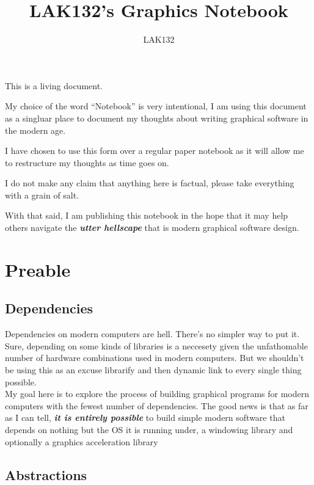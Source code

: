 \documentclass{article}
\title{LAK132's Graphics Notebook}
\author{LAK132}
\newcommand{\textem}[1]{\textit{\textbf{#1}}}
\begin{document}
\maketitle

This is a living document.

My choice of the word ``Notebook'' is very intentional,
I am using this document as a singluar place to document my thoughts about
writing graphical software in the modern age.

I have chosen to use this form over a regular paper notebook as it will allow
me to restructure my thoughts as time goes on.

I do not make any claim that anything here is factual,
please take everything with a grain of salt.

With that said, I am publishing this notebook in the hope that it may help
others navigate the \textem{utter hellscape} that is modern graphical
software design.

\pagebreak
\tableofcontents


\pagebreak
\section{Preable}
\label{sec:preamble}

\subsection{Dependencies}
\label{subsect:dependencies}

Dependencies on modern computers are hell.
There's no simpler way to put it.
Sure, depending on some kinds of libraries is a neccesety given the
unfathomable number of hardware combinations used in modern computers.
But we shouldn't be using this as an excuse librarify and then dynamic link to
every single thing possible.
\\
My goal here is to explore the process of building graphical programs for
modern computers with the fewest number of dependencies.
The good news is that as far as I can tell,
\textem{it is entirely possible} to build simple modern software that
depends on nothing but the OS it is running under, a windowing library and
optionally a graphics acceleration library

\subsection{Abstractions}
\label{subsec:abstractions}
\end{document}
